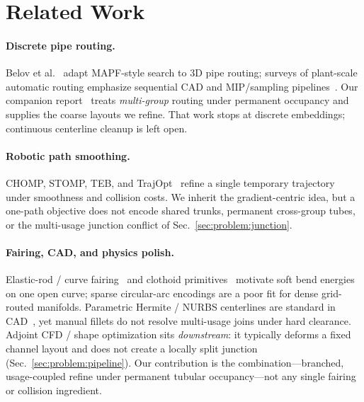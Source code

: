 
\section{Related Work}
\label{sec:related}

\paragraph{Discrete pipe routing.}
Belov et al.~\cite{belov2020pr} adapt MAPF-style search to 3D pipe routing;
surveys of plant-scale automatic routing emphasize sequential CAD and
MIP/sampling pipelines~\cite{blokland2023pipe}.
Our companion report~\cite{deng2025pipe_design} treats \emph{multi-group}
routing under permanent occupancy and supplies the coarse layouts we refine.
That work stops at discrete embeddings; continuous centerline cleanup is left
open.

\paragraph{Robotic path smoothing.}
CHOMP, STOMP, TEB, and TrajOpt~\cite{zucker2013chomp,kalakrishnan2011stomp,roesmann2013teb,schulman2014trajopt}
refine a single temporary trajectory under smoothness and collision costs.
We inherit the gradient-centric idea, but a one-path objective does not encode
shared trunks, permanent cross-group tubes, or the multi-usage junction conflict
of Sec.~\ref{sec:problem:junction}.

\paragraph{Fairing, CAD, and physics polish.}
Elastic-rod / curve fairing~\cite{moreton1992functional,bergou2008discrete}
and clothoid primitives~\cite{fraichard2004from} motivate soft bend energies on
one open curve; sparse circular-arc encodings are a poor fit for dense
grid-routed manifolds.
Parametric Hermite / NURBS centerlines are standard in CAD~\cite{piegl1997nurbs},
yet manual fillets do not resolve multi-usage joins under hard clearance.
Adjoint CFD / shape optimization sits \emph{downstream}: it typically deforms a
fixed channel layout and does not create a locally split junction
(Sec.~\ref{sec:problem:pipeline}).
Our contribution is the combination---branched, usage-coupled refine under
permanent tubular occupancy---not any single fairing or collision ingredient.
